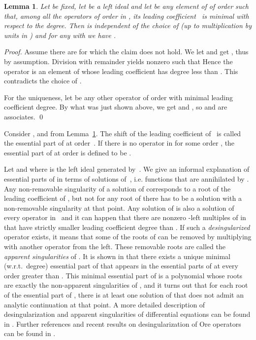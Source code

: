 \documentclass[3p,11pt,preprint]{elsarticle}
\newtheorem{lemma}{Lemma}
\begin{document}
\begin{lemma}
\label{lcthm}
 Let  be fixed, let   be a left ideal and let  be any element of  of order  such that, among all the operators of order  in , its leading coefficient~ is minimal with respect to the degree. Then  is independent of the choice of  (up to multiplication by units in ) and for any  with  we have . 
\end{lemma}
\begin{proof}
 Assume there are  for which the claim  does not hold.
 We let  and get , thus  by assumption.
 Division with remainder yields nonzero  such that 
 Hence the operator  is an element of  whose leading coefficient has degree less than . This contradicts the choice of .

\noindent For the uniqueness, let  be any other operator of order  with minimal leading \mbox{coefficient} degree. By what was just shown above, we get  and , so  and  are associates.
\qed
\end{proof}

 \begin{definition}
  Consider ,  and  from Lemma~\ref{lcthm}. The shift  of the leading coefficient of~ is called the essential part of  at order~. If there is no operator in  for some order , the essential part of  at order  is defined to be .
 \end{definition}

Let  and  where  is the left ideal generated by~. We give an informal explanation of essential parts of  in terms of solutions of~, i.e. functions that are annihilated by . Any non-removable singularity of a solution of  corresponds to a root of the leading coefficient of , but not for any root of  there has to be a solution with a non-removable singularity at that point. Any solution of  is also a solution of every operator in~ and it can happen that there are nonzero -left multiples of  in  that have strictly smaller leading coefficient degree than . If such a \textit{desingularized} operator exists, it means that some of the roots of  can be removed by multiplying  with another operator from the left. These removable roots are called the \textit{apparent singularities} of 
. It is shown in \cite{mythesis} that there exists a unique minimal (w.r.t.\ degree) essential part of  that appears in the essential parts of  at every order greater than . This minimal essential part of  is a polynomial whose roots are exactly the non-apparent singularities of , and it turns out that for each root of the essential part of , there is at least one solution of  that does not admit an analytic continuation at that point. A more detailed description of desingularization and apparent singularities of differential equations can be found in \cite{ince}. Further references and recent results on desingularization of Ore operators can be found in \cite{chen}.
\end{document}
